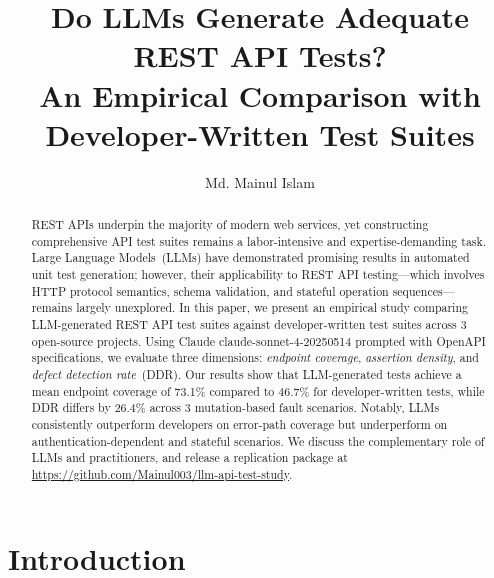 \documentclass[sigconf,review,anonymous=false]{acmart}
\begin{document}
\title{Do LLMs Generate Adequate REST API Tests?\\
An Empirical Comparison with Developer-Written Test Suites}

\author{Md. Mainul Islam}



\begin{abstract}
REST APIs underpin the majority of modern web services, yet constructing
comprehensive API test suites remains a labor-intensive and expertise-demanding
task. Large Language Models~(LLMs) have demonstrated promising results in
automated unit test generation; however, their applicability to REST API
testing---which involves HTTP protocol semantics, schema validation, and
stateful operation sequences---remains largely unexplored.
%
In this paper, we present an empirical study comparing LLM-generated REST API
test suites against developer-written test suites across 3 open-source
projects. Using Claude claude-sonnet-4-20250514 prompted
with OpenAPI specifications, we evaluate three dimensions: \emph{endpoint
coverage}, \emph{assertion density}, and \emph{defect detection rate}~(DDR).
Our results show that LLM-generated tests achieve a mean endpoint coverage of
73.1\% compared to 46.7\% for developer-written tests, while DDR
differs by 26.4\% across 3 mutation-based fault scenarios.
Notably, LLMs consistently outperform developers on error-path coverage but
underperform on authentication-dependent and stateful scenarios.
We discuss the complementary role of LLMs and practitioners, and release
a replication package at \url{https://github.com/Mainul003/llm-api-test-study}.
\end{abstract}


\maketitle

\section{Introduction}\label{sec:intro}
\end{document}
